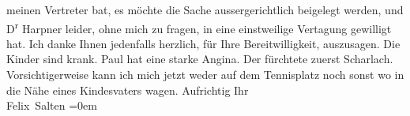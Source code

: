 \begin{ledgroupsized}[t]{13cm}
               meinen Vertreter bat, es
               möchte die Sache aussergerichtlich beigelegt werden, und D\textsuperscript{r}{ }Harpner leider, ohne mich zu fragen, in eine
               einstweilige Vertagung gewilligt hat. Ich danke Ihnen jedenfalls herzlich, für Ihre
               Bereitwilligkeit, auszusagen.\pend
           \pstart
           Die Kinder sind krank. Paul hat eine starke Angina. Der \label{K_L03435-3v}\label{K_L03435-3h} fürchtete zuerst
               Scharlach. Vorsichtigerweise kann ich mich jetzt weder auf dem Tennisplatz noch sonst
               wo in die Nähe eines Kindesvaters wagen.\pend
           \pstart
           Aufrichtig Ihr {\\[\baselineskip]}\spacefill\mbox{Felix Salten}\pend
           \leftskip=0em{}
         
         \endnumbering{}\end{ledgroupsized}  \newcommand{\dateiname}{L03435}\newcommand{\titel}{Felix Salten an Arthur Schnitzler, [20.? 10. 1906]}\newcommand{\editorInnen}{Martin Anton Müller und Laura Untner}
      